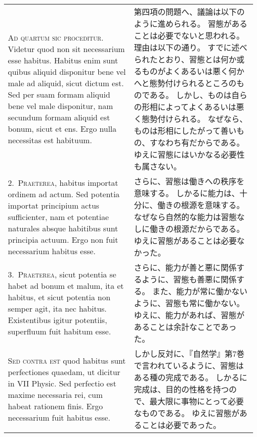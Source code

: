 \documentclass[10pt]{jsarticle} %
\begin{document}
\begin{longtable}{p{21em}p{21em}}
{\scshape Ad quartum sic proceditur}. Videtur quod non sit necessarium esse
 habitus. Habitus enim sunt quibus aliquid disponitur bene vel male ad
 aliquid, sicut dictum est. Sed per suam formam aliquid bene vel male
 disponitur, nam secundum formam aliquid est bonum, sicut et ens. Ergo
 nulla necessitas est habituum.

&

第四項の問題へ、議論は以下のように進められる。
習態があることは必要でないと思われる。理由は以下の通り。
すでに述べられたとおり、習態とは何か或るものがよくあるいは悪く何かへと態勢付けられるところのものである。
しかし、ものは自らの形相によってよくあるいは悪く態勢付けられる。
なぜなら、ものは形相にしたがって善いもの、すなわち有だからである。
ゆえに習態にはいかなる必要性も属さない。

\\



2.~{\scshape Praeterea}, habitus importat ordinem ad actum. Sed potentia importat
 principium actus sufficienter, nam et potentiae naturales absque
 habitibus sunt principia actuum. Ergo non fuit necessarium habitus
 esse.

&

さらに、習態は働きへの秩序を意味する。
しかるに能力は、十分に、働きの根源を意味する。
なぜなら自然的な能力は習態なしに働きの根源だからである。
ゆえに習態があることは必要なかった。

\\



3.~{\scshape Praeterea}, sicut potentia se habet ad bonum et malum, ita et habitus,
 et sicut potentia non semper agit, ita nec habitus. Existentibus
 igitur potentiis, superfluum fuit habitum esse.

&

さらに、能力が善と悪に関係するように、習態も善悪に関係する。
また、能力が常に働かないように、習態も常に働かない。
ゆえに、能力があれば、習態があることは余計なことであった。

\\



{\scshape Sed contra est} quod habitus sunt perfectiones quaedam, ut dicitur in
 VII Physic. Sed perfectio est maxime necessaria rei, cum habeat
 rationem finis. Ergo necessarium fuit habitus esse.

&

しかし反対に、『自然学』第7巻で言われているように、習態はある種の完成である。
しかるに完成は、目的の性格を持つので、最大限に事物にとって必要なものである。
ゆえに習態があることは必要であった。


\end{longtable}
\end{document}
